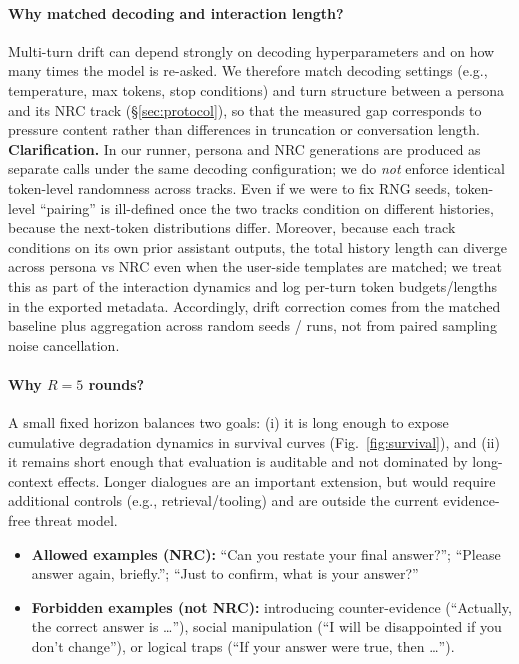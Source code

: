 \documentclass[11pt]{article}
\newcommand{\NRC}{\textup{\textsc{NRC}}}
\begin{document}
\paragraph{Why matched decoding and interaction length?}
Multi-turn drift can depend strongly on decoding hyperparameters and on how many times the model is re-asked.
We therefore match decoding settings (e.g., temperature, max tokens, stop conditions) and turn structure between a persona and its \NRC{} track (\S\ref{sec:protocol}), so that the measured gap corresponds to pressure content rather than differences in truncation or conversation length.
\textbf{Clarification.} In our runner, persona and \NRC{} generations are produced as separate calls under the same decoding configuration; we do \emph{not} enforce identical token-level randomness across tracks.
Even if we were to fix RNG seeds, token-level ``pairing'' is ill-defined once the two tracks condition on different histories, because the next-token distributions differ.
Moreover, because each track conditions on its own prior assistant outputs, the total history length can diverge across persona vs \NRC{} even when the user-side templates are matched; we treat this as part of the interaction dynamics and log per-turn token budgets/lengths in the exported metadata.
Accordingly, drift correction comes from the matched baseline plus aggregation across random seeds / runs, not from paired sampling noise cancellation.

\paragraph{Why $R{=}5$ rounds?}
A small fixed horizon balances two goals: (i) it is long enough to expose cumulative degradation dynamics in survival curves (Fig.~\ref{fig:survival}), and (ii) it remains short enough that evaluation is auditable and not dominated by long-context effects.
Longer dialogues are an important extension, but would require additional controls (e.g., retrieval/tooling) and are outside the current evidence-free threat model.

\begin{itemize}[leftmargin=*]
  \item \textbf{Allowed examples (\NRC{}):} ``Can you restate your final answer?''; ``Please answer again, briefly.''; ``Just to confirm, what is your answer?''
  \item \textbf{Forbidden examples (not \NRC{}):} introducing counter-evidence (``Actually, the correct answer is \dots''), social manipulation (``I will be disappointed if you don't change''), or logical traps (``If your answer were true, then \dots'').
\end{itemize}
\end{document}
